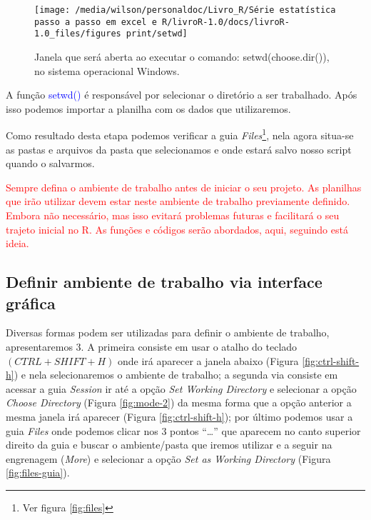 \documentclass[titlepage, oneside, openany, a4paper]{book}
\begin{document}
\begin{figure}

{\centering \texttt{[image: /media/wilson/personaldoc/Livro\_R/Série estatística passo a passo em excel e R/livroR-1.0/docs/livroR-1.0\_files/figures print/setwd]} 

}

\caption{Janela que será aberta ao executar o comando: setwd(choose.dir()), no sistema operacional Windows.}\label{fig:setwd}
\end{figure}

A função \textcolor{blue}{setwd()} é responsável por selecionar o diretório a ser trabalhado. Após isso podemos importar a planilha com os dados que utilizaremos.

Como resultado desta etapa podemos verificar a guia \emph{Files}\footnote{Ver figura \ref{fig:files}}, nela agora situa-se as pastas e arquivos da pasta que selecionamos e onde estará salvo nosso script quando o salvarmos.

\textcolor{red}{Sempre defina o ambiente de trabalho antes de iniciar o seu projeto. As planilhas que irão utilizar devem estar neste ambiente de trabalho previamente definido. Embora não necessário, mas isso evitará problemas futuras e facilitará o seu trajeto inicial no R. As funções e códigos serão abordados, aqui, seguindo está ideia.}

\hypertarget{definir-ambiente-de-trabalho-via-interface-gruxe1fica}{%
\subsection{Definir ambiente de trabalho via interface gráfica}\label{definir-ambiente-de-trabalho-via-interface-gruxe1fica}}

Diversas formas podem ser utilizadas para definir o ambiente de trabalho, apresentaremos 3. A primeira consiste em usar o atalho do teclado \((CTRL + SHIFT + H)\) onde irá aparecer a janela abaixo (Figura \ref{fig:ctrl-shift-h}) e nela selecionaremos o ambiente de trabalho; a segunda via consiste em acessar a guia \emph{Session} ir até a opção \emph{Set Working Directory} e selecionar a opção \emph{Choose Directory} (Figura \ref{fig:mode-2}) da mesma forma que a opção anterior a mesma janela irá aparecer (Figura \ref{fig:ctrl-shift-h}); por último podemos usar a guia \emph{Files} onde podemos clicar nos 3 pontos ``\ldots{}'' que aparecem no canto superior direito da guia e buscar o ambiente/pasta que iremos utilizar e a seguir na engrenagem (\emph{More}) e selecionar a opção \emph{Set as Working Directory} (Figura \ref{fig:files-guia}).
\end{document}

